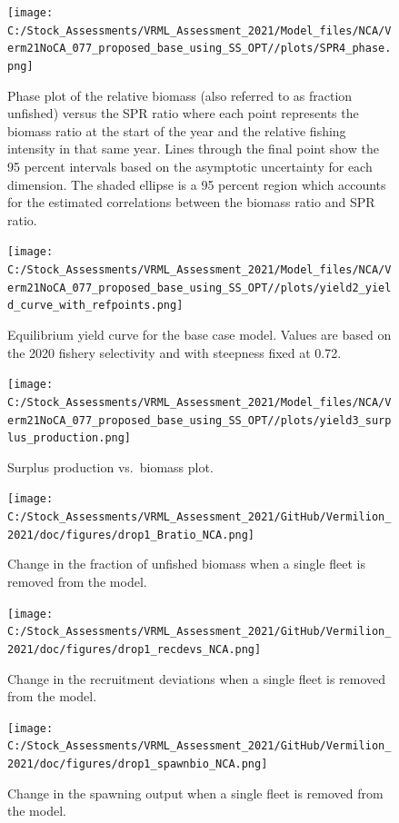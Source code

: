 \documentclass[
  english,
  a4paper,
]{article}
\begin{document}
\begin{figure}
\centering
\texttt{[image: C:/Stock\_Assessments/VRML\_Assessment\_2021/Model\_files/NCA/Verm21NoCA\_077\_proposed\_base\_using\_SS\_OPT//plots/SPR4\_phase.png]}
\caption{Phase plot of the relative biomass (also referred to as fraction unfished) versus the SPR ratio where each point represents the biomass ratio at the start of the year and the relative fishing intensity in that same year. Lines through the final point show the 95 percent intervals based on the asymptotic uncertainty for each dimension. The shaded ellipse is a 95 percent region which accounts for the estimated correlations between the biomass ratio and SPR ratio.\label{fig:phase}}
\end{figure}

\begin{figure}
\centering
\texttt{[image: C:/Stock\_Assessments/VRML\_Assessment\_2021/Model\_files/NCA/Verm21NoCA\_077\_proposed\_base\_using\_SS\_OPT//plots/yield2\_yield\_curve\_with\_refpoints.png]}
\caption{Equilibrium yield curve for the base case model. Values are based on the 2020
fishery selectivity and with steepness fixed at 0.72.\label{fig:yield2}}
\end{figure}

\begin{figure}
\centering
\texttt{[image: C:/Stock\_Assessments/VRML\_Assessment\_2021/Model\_files/NCA/Verm21NoCA\_077\_proposed\_base\_using\_SS\_OPT//plots/yield3\_surplus\_production.png]}
\caption{Surplus production vs.~biomass plot.\label{fig:yield3}}
\end{figure}

\FloatBarrier

\begin{figure}
\centering
\texttt{[image: C:/Stock\_Assessments/VRML\_Assessment\_2021/GitHub/Vermilion\_2021/doc/figures/drop1\_Bratio\_NCA.png]}
\caption{Change in the fraction of unfished biomass when a single fleet is removed from the model.\label{fig:drop-bratio}}
\end{figure}

\begin{figure}
\centering
\texttt{[image: C:/Stock\_Assessments/VRML\_Assessment\_2021/GitHub/Vermilion\_2021/doc/figures/drop1\_recdevs\_NCA.png]}
\caption{Change in the recruitment deviations when a single fleet is removed from the model.\label{fig:drop-recdev}}
\end{figure}

\begin{figure}
\centering
\texttt{[image: C:/Stock\_Assessments/VRML\_Assessment\_2021/GitHub/Vermilion\_2021/doc/figures/drop1\_spawnbio\_NCA.png]}
\caption{Change in the spawning output when a single fleet is removed from the model.\label{fig:drop-spawnbio}}
\end{figure}
\end{document}
